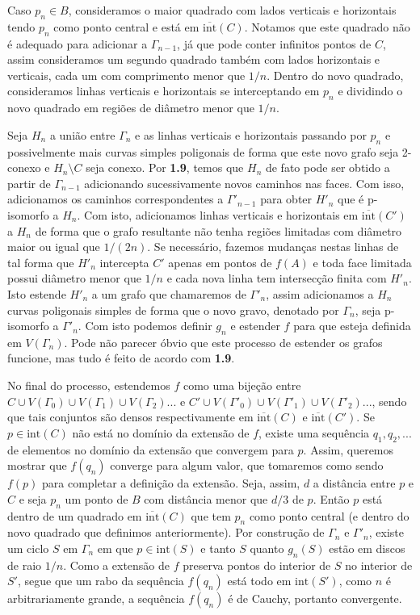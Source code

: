 \documentclass[12pt,a4paper]{article}
\theoremstyle{definition}
\begin{document}
Caso $p_n \in B$, consideramos o maior quadrado com lados verticais e horizontais tendo $p_n$ como ponto central e está em $\overline{\text{int}}(C)$. Notamos que este quadrado não é adequado para adicionar a $\Gamma_{n-1}$, já que pode conter infinitos pontos de $C$, assim consideramos um segundo quadrado também com lados horizontais e verticais, cada um com comprimento menor que $1/n$. Dentro do novo quadrado, consideramos linhas verticais e horizontais se interceptando em $p_n$ e dividindo o novo quadrado em regiões de diâmetro menor que $1/n$.
 
Seja $H_n$ a união entre $\Gamma_n$ e as linhas verticais e horizontais passando por $p_n$ e possivelmente mais curvas simples poligonais de forma que este novo grafo seja 2-conexo e $H_n\setminus C$ seja conexo. Por \textbf{1.9}, temos que $H_n$ de fato pode ser obtido a partir de $\Gamma_{n-1}$ adicionando sucessivamente novos caminhos nas faces. Com isso, adicionamos os caminhos correspondentes a $\Gamma'_{n-1}$ para obter $H'_n$ que é p-isomorfo a $H_n$. Com isto, adicionamos linhas verticais e horizontais em $\overline{\text{int}}(C')$ a $H_n$ de forma que o grafo resultante não tenha regiões limitadas com diâmetro maior ou igual que $1/(2n)$. Se necessário, fazemos mudanças nestas linhas de tal forma que $H'_n$ intercepta $C'$ apenas em pontos de $f(A)$ e toda face limitada possui diâmetro menor que $1/n$ e cada nova linha tem intersecção finita com $H'_n$. Isto estende $H'_n$ a um grafo que chamaremos de $\Gamma'_n$, assim adicionamos a $H_n$ curvas poligonais simples de forma que o novo gravo, denotado por $\Gamma_n$, seja p-isomorfo a $\Gamma'_n$. Com isto podemos definir $g_n$ e estender $f$ para que esteja definida em $V(\Gamma_n)$. Pode não parecer óbvio que este processo de estender os grafos funcione, mas tudo é feito de acordo com \textbf{1.9}.
 
No final do processo, estendemos $f$ como uma bijeção entre $C\cup V(\Gamma_0)\cup V(\Gamma_1)\cup V(\Gamma_2)...$ e $C'\cup V(\Gamma'_0)\cup V(\Gamma'_1)\cup V(\Gamma'_2)...$, sendo que tais conjuntos são densos respectivamente em $\overline{\text{int}}(C)$ e $\overline{\text{int}}(C')$. Se $p\in \text{int}(C)$ não está no domínio da extensão de $f$, existe uma sequência $q_1,q_2,...$ de elementos no domínio da extensão que convergem para $p$. Assim, queremos mostrar que $f(q_n)$ converge para algum valor, que tomaremos como sendo $f(p)$ para completar a definição da extensão. Seja, assim, $d$ a distância entre $p$ e $C$ e seja $p_n$ um ponto de $B$ com distância menor que $d/3$ de $p$. Então $p$ está dentro de um quadrado em $\overline{\text{int}}(C)$ que tem $p_n$ como ponto central (e dentro do novo quadrado que definimos anteriormente). Por construção de $\Gamma_n$ e $\Gamma'_n$, existe um ciclo $S$ em $\Gamma_n$ em que $p\in \text{int}(S)$ e tanto $S$ quanto $g_n(S)$ estão em discos de raio $1/n$. Como a extensão de $f$ preserva pontos do interior de $S$ no interior de $S'$, segue que um rabo da sequência $f(q_n)$ está todo em $\text{int}(S')$, como $n$ é arbitrariamente grande, a sequência $f(q_n)$ é de Cauchy, portanto convergente.
 
\end{document}
